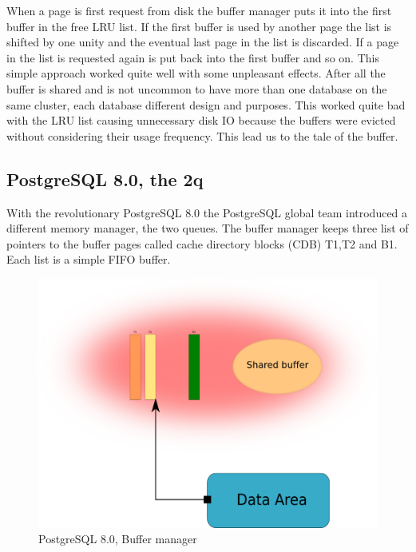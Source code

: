 When a page is first request from disk the buffer manager puts it into the first buffer in the free LRU 
list. If the first buffer is used by another page the list is shifted by one unity and the eventual last 
page in the list is discarded. If a page in the list is requested again is put back into the first buffer 
and so on. This simple approach worked quite well with some unpleasant effects. After all the buffer is 
shared and is not uncommon to have more than one database on the same cluster, each database different 
design and purposes. This worked quite bad with the LRU list causing unnecessary disk IO because the 
buffers were evicted without considering their usage frequency. This lead us to the tale of the buffer.


\subsection{PostgreSQL 8.0, the 2q}
With the revolutionary PostgreSQL 8.0 the PostgreSQL global team introduced a different memory manager, the two 
queues.\newline 
The buffer manager keeps three list of pointers to the buffer pages called cache directory blocks (CDB) T1,T2 and 
B1. Each list is a simple FIFO buffer.\newline

\begin{figure}[H]
\includegraphics[scale=0.20]{images/shared_buffer_80.png}

\caption{PostgreSQL 8.0, Buffer manager}

\end{figure}

